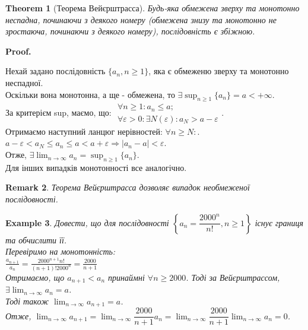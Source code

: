 \documentclass[a4paper, 14pt]{article}
\makeatletter
\def\qed{$\blacksquare$}
\theoremstyle{theoremdd}
\newtheorem{theorem}{Theorem}[subsection]
\theoremstyle{theoremdd}
\theoremstyle{theoremdd}
\theoremstyle{theoremdd}
\newtheorem{example}[theorem]{Example}
\theoremstyle{theoremdd}
\theoremstyle{theoremdd}
\newtheorem{remark}[theorem]{Remark}
\theoremstyle{theoremdd}
\theoremstyle{theoremdd}
\renewenvironment{proof}[1][Proof.\\]{\par
\pushQED{\hfill \qed}%
\normalfont \topsep6\p@\@plus6\p@\relax
\trivlist
\item\relax
{\bfseries
#1\@addpunct{.}}\hspace\labelsep\ignorespaces
}{%
\popQED\endtrivlist\@endpefalse
}
\makeatother
\begin{document}
	\begin{theorem}[Теорема Вейєрштрасса]
	Будь-яка обмежена зверху та монотонно неспадна, починаючи з деякого номеру (обмежена знизу та монотонно не зростаюча, починаючи з деякого номеру), послідовність є збіжною.
	\end{theorem}
	\begin{proof}
	Нехай задано послідовність $\{a_n, n \geq 1\}$, яка є обмеженю зверху та монотонно неспадної.\\
	Оскільки вона монотонна, а ще - обмежена, то $\exists \displaystyle\sup_{n \geq 1}\{a_n\} = a < +\infty$.\\
	За критерієм sup, маємо, що: $ \begin{gathered}
	\forall n \geq 1: a_n \leq a ;\\
	\forall \varepsilon > 0: \exists N(\varepsilon): a_{N} > a - \varepsilon
	\end{gathered}$.\\
	Отримаємо наступний ланцюг нерівностей: $\forall n \geq N:$.\\
	$a-\varepsilon < a_N \leq a_n \leq a < a + \varepsilon \Rightarrow |a_n-a|<\varepsilon$.\\
	Отже, $\displaystyle \exists \lim_{n \to \infty} a_n = \sup_{n \geq 1}\{a_n\}$.
	\bigskip \\
	Для інших випадків монотонності все аналогічно.
	\end{proof}
	
	\begin{remark}
	Теорема Вейєрштрасса дозволяє випадок необмеженої послідовності.
	\end{remark}
	
	\begin{example}
	Довести, що для послідовності $\left\{ a_n = \dfrac{2000^n}{n!}, n \geq 1 \right\}$ існує границя та обчислити її.\\
	Перевіримо на монотонність:\\
	$\displaystyle \frac{a_{n+1}}{a_n} = \frac{2000^{n+1} n!}{(n+1)! 2000^n} = \frac{2000}{n+1}$\\
	Отримаємо, що $a_{n+1} < a_n$ принаймні $\forall n \geq 2000$. Тоді за Вейєрштрассом, $\exists \displaystyle \lim_{n \to \infty} a_n = a$.\\
	Тоді також $\displaystyle \lim_{n \to \infty} a_{n+1} = a$.\\
	Отже, $\displaystyle \lim_{n \to \infty} a_{n+1} = \lim_{n \to \infty} \dfrac{2000}{n+1} a_n = \lim_{n \to \infty} \dfrac{2000}{n+1} \lim_{n \to \infty} a_n = 0$.
	\end{example}
	
\end{document}
